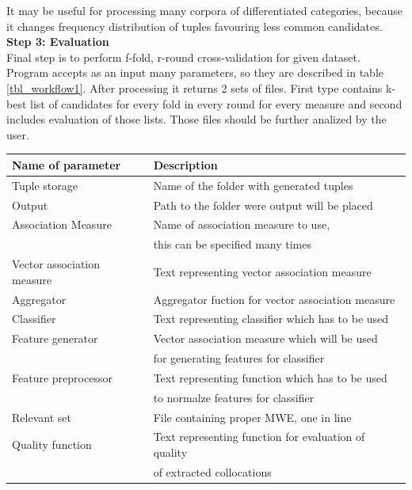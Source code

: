 It may be useful for processing many corpora of differentiated categories, because it changes frequency distribution of tuples 
favouring less common candidates.
\\ \textbf{Step 3: Evaluation}\\
Final step is to perform f-fold, r-round cross-validation for given dataset. Program accepts as an input many parameters, 
so they are described in table \ref{tbl_workflow1}. After processing it returns 2 sets of files. First type contains k-best list 
of candidates for every fold in every round for every measure and second includes evaluation of those lists. 
Those files should be further analized by the user. 

\begin{table}[t]
    \centering
    \begin{tabular*}{0.9\textwidth}{|l @{\extracolsep{\fill}} l|}
        \hline 
        \textbf{Name of parameter} & \textbf{Description} \\
        \hline
        Tuple storage & Name of the folder with generated tuples \\
        \hline
        Output & Path to the folder were output will be placed \\
        \hline
        Association Measure & Name of association measure to use, \\& this can be specified many times \\
        \hline
        Vector association measure & Text representing vector association measure \\
        \hline
        Aggregator & Aggregator fuction for vector association measure \\
        \hline
        Classifier & Text representing classifier which has to be used \\
        \hline
        Feature generator & Vector association measure which will be used \\& for generating features for classifier \\
        \hline
        Feature preprocessor & Text representing function which has to be used \\& to normalze features for classifier \\
        \hline
        Relevant set & File containing proper MWE, one in line \\
        \hline
        Quality function & Text representing function for evaluation of quality \\& of extracted collocations \\

\end{tabular*}
\end{table}
